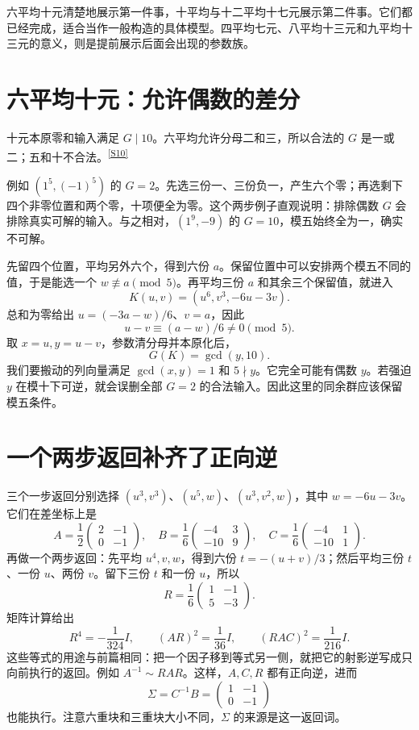 \documentclass[11pt,a4paper,oneside,openany]{book}
\newcommand{\src}[1]{\textsuperscript{\hyperref[source:#1]{[#1]}}}
\theoremstyle{definition}\newtheorem{example}[theorem]{例}\newtheorem{conjecture}[theorem]{猜想}
\numberwithin{equation}{chapter}\setcounter{tocdepth}{1}
\begin{document}
六平均十元清楚地展示第一件事，十平均与十二平均十七元展示第二件事。它们都已经完成，适合当作一般构造的具体模型。四平均七元、八平均十三元和九平均十三元的意义，则是提前展示后面会出现的参数族。

\section{六平均十元：允许偶数的差分}
十元本原零和输入满足 $G\mid10$。六平均允许分母二和三，所以合法的 $G$ 是一或二；五和十不合法。\src{S10}

例如 $(1^5,(-1)^5)$ 的 $G=2$。先选三份一、三份负一，产生六个零；再选剩下四个非零位置和两个零，十项便全为零。这个两步例子直观说明：排除偶数 $G$ 会排除真实可解的输入。与之相对，$(1^9,-9)$ 的 $G=10$，模五始终全为一，确实不可解。

先留四个位置，平均另外六个，得到六份 $a$。保留位置中可以安排两个模五不同的值，于是能选一个 $w\not\equiv a\pmod5$。再平均三份 $a$ 和其余三个保留值，就进入
\[
K(u,v)=(u^6,v^3,-6u-3v).
\]
总和为零给出 $u=(-3a-w)/6$、$v=a$，因此
\[u-v\equiv(a-w)/6\ne0\pmod5.
\]
取 $x=u,y=u-v$，参数清分母并本原化后，
\[G(K)=\gcd(y,10).
\]
我们要搬动的列向量满足 $\gcd(x,y)=1$ 和 $5\nmid y$。它完全可能有偶数 $y$。若强迫 $y$ 在模十下可逆，就会误删全部 $G=2$ 的合法输入。因此这里的同余群应该保留模五条件。

\section{一个两步返回补齐了正向逆}
三个一步返回分别选择 $(u^3,v^3)$、$(u^5,w)$、$(u^3,v^2,w)$，其中 $w=-6u-3v$。它们在差坐标上是
\[
A=\frac12\begin{pmatrix}2&-1\\0&-1\end{pmatrix},\quad
B=\frac16\begin{pmatrix}-4&3\\-10&9\end{pmatrix},\quad
C=\frac16\begin{pmatrix}-4&1\\-10&1\end{pmatrix}.
\]
再做一个两步返回：先平均 $u^4,v,w$，得到六份 $t=-(u+v)/3$；然后平均三份 $t$、一份 $u$、两份 $v$。留下三份 $t$ 和一份 $u$，所以
\[
R=\frac16\begin{pmatrix}1&-1\\5&-3\end{pmatrix}.
\]
矩阵计算给出
\[
R^4=-\frac1{324}I,\qquad(AR)^2=\frac1{36}I,
\qquad(RAC)^2=\frac1{216}I.
\]
这些等式的用途与前篇相同：把一个因子移到等式另一侧，就把它的射影逆写成只向前执行的返回。例如 $A^{-1}\sim RAR$。这样，$A,C,R$ 都有正向逆，进而
\[\Sigma=C^{-1}B=\begin{pmatrix}1&-1\\0&-1\end{pmatrix}
\]
也能执行。注意六重块和三重块大小不同，$\Sigma$ 的来源是这一返回词。
\end{document}
